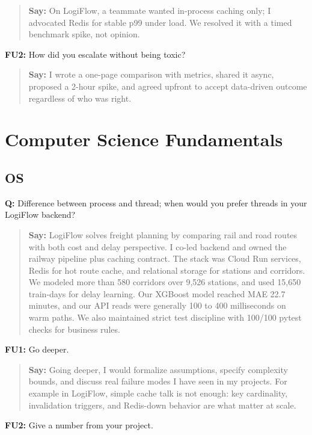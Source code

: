 \documentclass[9pt,a4paper]{article}
\begin{document}
\begin{quote}\small\textbf{Say:} On LogiFlow, a teammate wanted in-process caching only; I advocated Redis for stable p99 under load. We resolved it with a timed benchmark spike, not opinion.\end{quote}
\vspace{2mm}
\textbf{FU2:} How did you escalate without being toxic?

\begin{quote}\small\textbf{Say:} I wrote a one-page comparison with metrics, shared it async, proposed a 2-hour spike, and agreed upfront to accept data-driven outcome regardless of who was right.\end{quote}
\vspace{2mm}
\newpage\section{Computer Science Fundamentals}
\subsection{OS}
\textbf{Q:} Difference between process and thread; when would you prefer threads in your LogiFlow backend?

\begin{quote}\small\textbf{Say:} LogiFlow solves freight planning by comparing rail and road routes with both cost and delay perspective. I co-led backend and owned the railway pipeline plus caching contract. The stack was Cloud Run services, Redis for hot route cache, and relational storage for stations and corridors. We modeled more than 580 corridors over 9,526 stations, and used 15,650 train-days for delay learning. Our XGBoost model reached MAE 22.7 minutes, and our API reads were generally 100 to 400 milliseconds on warm paths. We also maintained strict test discipline with 100/100 pytest checks for business rules.\end{quote}
\vspace{2mm}
\textbf{FU1:} Go deeper.

\begin{quote}\small\textbf{Say:} Going deeper, I would formalize assumptions, specify complexity bounds, and discuss real failure modes I have seen in my projects. For example in LogiFlow, simple cache talk is not enough: key cardinality, invalidation triggers, and Redis-down behavior are what matter at scale.\end{quote}
\vspace{2mm}
\textbf{FU2:} Give a number from your project.
\end{document}
